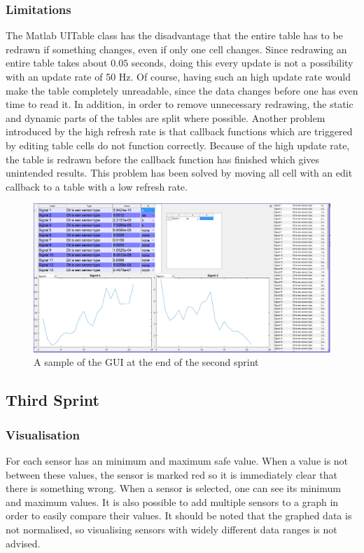 \subsubsection{Limitations}

The Matlab UITable class has the disadvantage that the entire table has to be redrawn if something changes, even if only one cell changes. Since redrawing an entire table takes about $0.05$ seconds, 
doing this every update is not a possibility with an update rate of 50 Hz. Of course, having such an high update rate would make the table completely unreadable, since the data changes before one has even time to read it. In addition, in order to remove unnecessary redrawing, the static and dynamic parts of the tables are split where possible. Another problem introduced by the high refresh rate is that callback functions which are triggered by editing table cells do not function correctly. Because of the high update rate, the table is redrawn before the callback function has finished which gives unintended results. This problem has been solved by moving all cell with an edit callback to a table with a low refresh rate. 

\begin{figure}[H]
	\centering
	\includegraphics[width=.75\textwidth]{images/GUIV1}
	\caption{A sample of the GUI at the end of the second sprint} 
	\label{fig:GUIV1}
\end{figure} 

\subsection{Third Sprint}

\subsubsection{Visualisation}

For each sensor has an minimum and maximum safe value. When a value is not between these values, the sensor is marked red so it is immediately clear that there is something wrong. When a sensor is selected, one can see its minimum and maximum values. It is also possible to add multiple sensors to a graph in order to easily compare their values. It should be noted that the graphed data is not normalised, so visualising sensors with widely different data ranges is not advised.  

